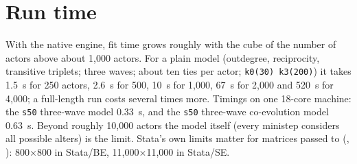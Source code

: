 \section{Run time}
With the native engine, fit time grows roughly with the cube of the number of actors above about 1,000 actors. For a plain model (outdegree, reciprocity, transitive triplets; three waves; about ten ties per actor; \texttt{k0(30) k3(200)}) it takes 1.5~s for 250 actors, 2.6~s for 500, 10~s for 1,000, 67~s for 2,000 and 520~s for 4,000; a full-length run costs several times more. Timings on one 18-core machine: the \texttt{s50} three-wave model  0.33~s, and the \texttt{s50} three-wave co-evolution model 0.63~s. Beyond roughly 10,000 actors the model itself (every ministep considers all possible alters) is the limit. Stata's own limits matter for matrices passed to \nwsaom{} (, ): 800$\times$800 in Stata/BE, 11,000$\times$11,000 in Stata/SE.
